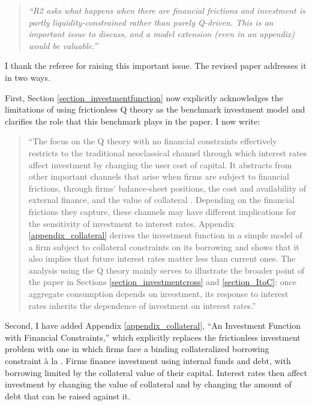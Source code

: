 \documentclass[11pt]{article}
\begin{document}
\begin{enumerate}[a)]
\begin{quote}
\itshape ``R2 asks what happens when there are financial frictions and investment is partly liquidity-constrained rather than purely Q-driven. This is an important issue to discuss, and a model extension (even in an appendix) would be valuable.''
\end{quote}

I thank the referee for raising this important issue. The revised paper addresses it in two ways.

First, Section \ref{section_investmentfunction} now explicitly acknowledges the limitations of using frictionless Q theory as the benchmark investment model and clarifies the role that this benchmark plays in the paper. I now write:

\begin{quote}
``The focus on the Q theory with no financial constraints effectively restricts to the traditional neoclassical channel through which interest rates affect investment by changing the user cost of capital. It abstracts from other important channels that arise when firms are subject to financial frictions, through firms' balance-sheet positions, the cost and availability of external finance, and the value of collateral \citep[e.g.][]{BernankeGertler1989,KiyotakiMoore1997,OttonelloWinberry2020,CloyneEtAl2023}. Depending on the financial frictions they capture, these channels may have different implications for the sensitivity of investment to interest rates. Appendix \ref{appendix_collateral} derives the investment function in a simple model of a firm subject to collateral constraints on its borrowing and shows that it also implies that future interest rates matter less than current ones. The analysis using the Q theory mainly serves to illustrate the broader point of the paper in Sections \ref{section_investmentcross} and \ref{section_ItoC}: once aggregate consumption depends on investment, its response to interest rates inherits the dependence of investment on interest rates.''
\end{quote}

Second, I have added Appendix \ref{appendix_collateral}, ``An Investment Function with Financial Constraints,'' which explicitly replaces the frictionless investment problem with one in which firms face a binding collateralized borrowing constraint \`a la \cite{KiyotakiMoore1997}. Firms finance investment using internal funds and debt, with borrowing limited by the collateral value of their capital. Interest rates then affect investment by changing the value of collateral and by changing the amount of debt that can be raised against it.


\end{enumerate}
\end{document}
